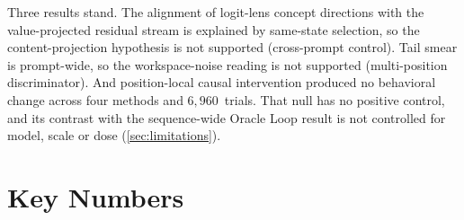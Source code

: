 \documentclass[11pt,a4paper]{article}
\begin{document}
Three results stand. The alignment of logit-lens concept directions with
the value-projected residual stream is explained by same-state
selection, so the content-projection hypothesis is not supported
(cross-prompt control). Tail smear is prompt-wide, so the workspace-noise
reading is not supported (multi-position discriminator). And
position-local causal intervention produced no behavioral change across
four methods and $6{,}960$~trials. That null has no positive control, and
its contrast with the sequence-wide Oracle Loop result is not controlled
for model, scale or dose (\cref{sec:limitations}).

\appendix

\section{Key Numbers}
\label{app:numbers}
\end{document}
